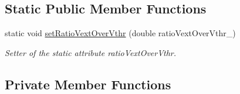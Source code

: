 \subsection*{Static Public Member Functions}
\begin{DoxyCompactItemize}
\item 
static void \hyperlink{classNeuron_ac1a73d639befdae8610674bb66c15831}{set\-Ratio\-Vext\-Over\-Vthr} (double ratio\-Vext\-Over\-Vthr\-\_\-)
\begin{DoxyCompactList}\small\item\em Setter of the static attribute ratio\-Vext\-Over\-Vthr. \end{DoxyCompactList}\end{DoxyCompactItemize}
\subsection*{Private Member Functions}
